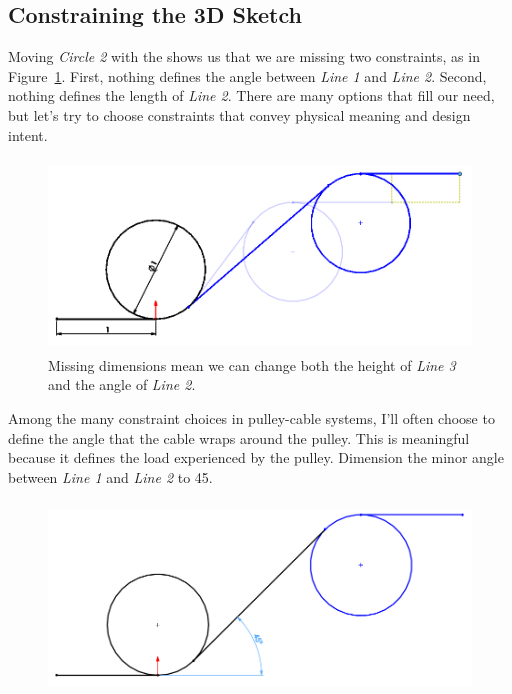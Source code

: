 \subsection{Constraining the 3D Sketch}

Moving \emph{Circle 2} with the  shows us that we are missing two
constraints, as in Figure~\ref{fig:unconstrained-entities}.
First, nothing defines the angle between \emph{Line 1} and \emph{Line 2}. Second, nothing
defines the length of \emph{Line 2}. There are many options that fill our need, but
let's try to choose constraints that convey physical meaning and design intent.


\begin{figure}[H]
\begin{center}
  \includegraphics[height=2in]{images/figures/unconstrained-entities.png}
\end{center}
\caption{Missing dimensions mean we can change both the height of \emph{Line 3}
  and the angle of \emph{Line 2}.
\label{fig:unconstrained-entities}}
\end{figure}

Among the many constraint choices in pulley-cable systems, I'll often choose to
define the angle that the cable wraps around the pulley. This is meaningful
because it defines the load experienced by the pulley. Dimension the minor angle between \emph{Line 1}
and \emph{Line 2} to 45\textdegree.

\begin{figure}[H]
\begin{center}
  \includegraphics[height=2in]{images/figures/cable-wrap-dimension.png}
\end{center}
\end{figure}

